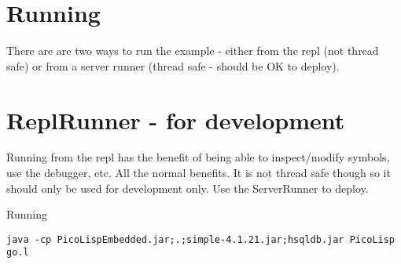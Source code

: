 \documentclass[10pt,a4paper]{article}
\begin{document}
\section*{Running}
There are are two ways to run the example - either from the repl (not thread safe) or from a server runner (thread safe - should be OK to deploy).


\section*{ReplRunner - for development}
Running from the repl has the benefit of being able to inspect/modify symbols, use the debugger, etc. All the normal benefits. It is not thread safe though so it should only be used for development only. Use the ServerRunner to deploy.

Running
\begin{verbatim}
java -cp PicoLispEmbedded.jar;.;simple-4.1.21.jar;hsqldb.jar PicoLisp go.l
\end{verbatim}
\end{document}
